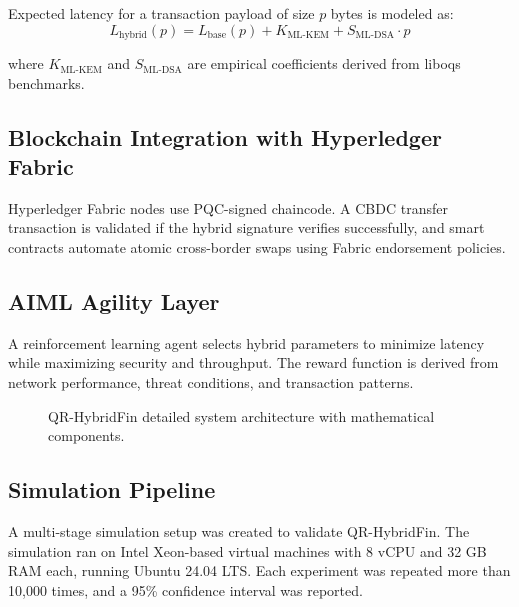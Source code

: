 \documentclass[pdflatex,sn-basic,english]{sn-jnl}
\begin{document}
Expected latency for a transaction payload of size \(p\) bytes is modeled as:
\begin{equation}
L_{\text{hybrid}}(p) = L_{\text{base}}(p) + K_{\text{ML-KEM}} + S_{\text{ML-DSA}} \cdot p
\end{equation}

where \(K_{\text{ML-KEM}}\) and \(S_{\text{ML-DSA}}\) are empirical coefficients derived from liboqs benchmarks.

\subsection{Blockchain Integration with Hyperledger Fabric}

Hyperledger Fabric nodes use PQC-signed chaincode. A CBDC transfer transaction is validated if the hybrid signature verifies successfully, and smart contracts automate atomic cross-border swaps using Fabric endorsement policies.

\subsection{AIML Agility Layer}

A reinforcement learning agent selects hybrid parameters to minimize latency while maximizing security and throughput. The reward function is derived from network performance, threat conditions, and transaction patterns.

\begin{figure}[htbp]
\centering
{}
\caption{QR-HybridFin detailed system architecture with mathematical components.}
\label{fig:math}
\end{figure}

\subsection{Simulation Pipeline}

A multi-stage simulation setup was created to validate QR-HybridFin. The simulation ran on Intel Xeon-based virtual machines with 8 vCPU and 32 GB RAM each, running Ubuntu 24.04 LTS. Each experiment was repeated more than 10,000 times, and a 95\% confidence interval was reported.
\end{document}
